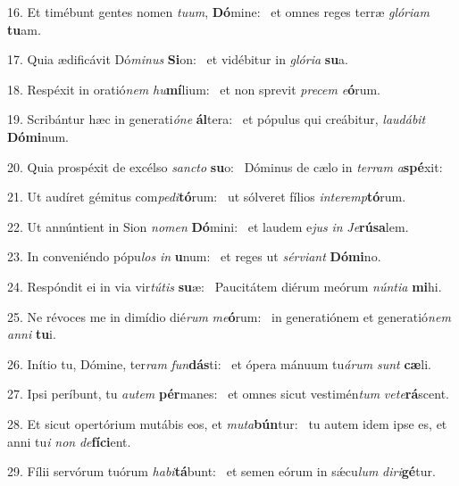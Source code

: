16. Et timébunt gentes nomen \textit{tu}\textit{um}, \textbf{Dó}mine: \ast\  et omnes reges terræ \textit{gló}\textit{ri}\textit{am} \textbf{tu}am.\

17. Quia ædificávit Dó\textit{mi}\textit{nus} \textbf{Si}on: \ast\  et vidébitur in \textit{gló}\textit{ri}\textit{a} \textbf{su}a.\

18. Respéxit in oratió\textit{nem} \textit{hu}\textbf{mí}lium: \ast\  et non sprevit \textit{pre}\textit{cem} \textit{e}\textbf{ó}rum.\

19. Scribántur hæc in generati\textit{ó}\textit{ne} \textbf{ál}tera: \ast\  et pópulus qui creábitur, \textit{lau}\textit{dá}\textit{bit} \textbf{Dó}\textbf{mi}num.\

20. Quia prospéxit de excélso \textit{sanc}\textit{to} \textbf{su}o: \ast\  Dóminus de cælo in \textit{ter}\textit{ram} \textit{a}\textbf{spé}xit:\

21. Ut audíret gémitus com\textit{pe}\textit{di}\textbf{tó}rum: \ast\  ut sólveret fílios \textit{in}\textit{ter}\textit{emp}\textbf{tó}rum.\

22. Ut annúntient in Sion \textit{no}\textit{men} \textbf{Dó}mini: \ast\  et laudem e\textit{jus} \textit{in} \textit{Je}\textbf{rú}\textbf{sa}lem.\

23. In conveniéndo pópu\textit{los} \textit{in} \textbf{u}num: \ast\  et reges ut \textit{sér}\textit{vi}\textit{ant} \textbf{Dó}\textbf{mi}no.\

24. Respóndit ei in via vir\textit{tú}\textit{tis} \textbf{su}æ: \ast\  Paucitátem diérum meórum \textit{nún}\textit{ti}\textit{a} \textbf{mi}hi.\

25. Ne révoces me in dimídio dié\textit{rum} \textit{me}\textbf{ó}rum: \ast\  in generatiónem et generatió\textit{nem} \textit{an}\textit{ni} \textbf{tu}i.\

26. Inítio tu, Dómine, ter\textit{ram} \textit{fun}\textbf{dás}ti: \ast\  et ópera mánuum tu\textit{á}\textit{rum} \textit{sunt} \textbf{cæ}li.\

27. Ipsi períbunt, tu \textit{au}\textit{tem} \textbf{pér}manes: \ast\  et omnes sicut vestimén\textit{tum} \textit{ve}\textit{te}\textbf{rá}scent.\

28. Et sicut opertórium mutábis eos, et \textit{mu}\textit{ta}\textbf{bún}tur: \ast\  tu autem idem ipse es, et anni tu\textit{i} \textit{non} \textit{de}\textbf{fí}\textbf{ci}ent.\

29. Fílii servórum tuórum \textit{ha}\textit{bi}\textbf{tá}bunt: \ast\  et semen eórum in sǽcu\textit{lum} \textit{di}\textit{ri}\textbf{gé}tur.\


